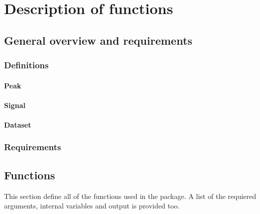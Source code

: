\chapter{Description of functions}\label{Functions}
\section{General overview and requirements}

\subsection{Definitions}
\subsubsection{Peak}
\subsubsection{Signal}
\subsubsection{Dataset}
\subsection{Requirements}

\section{Functions}
This section define all of the functions used in the package. A list of the requiered arguments, internal variables and output is provided too.
























